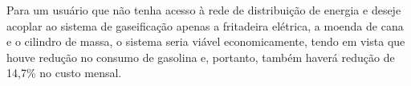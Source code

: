 Para um usuário que não tenha acesso à rede de distribuição de energia e deseje acoplar ao sistema de gaseificação apenas a fritadeira elétrica, a moenda de cana e o cilindro de massa, o sistema seria viável economicamente, tendo em vista que houve redução no consumo de gasolina e, portanto, também haverá redução de 14,7\% no custo mensal.

